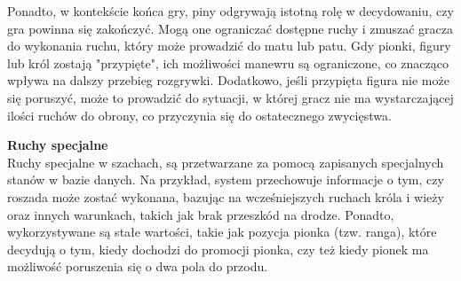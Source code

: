 \documentclass[twoside]{projektInzynierskiMS1}
\begin{document}
\noindent
Ponadto, w kontekście końca gry, piny odgrywają istotną rolę w decydowaniu, czy gra powinna się zakończyć. Mogą one ograniczać dostępne ruchy i zmuszać gracza do wykonania ruchu, który może prowadzić do matu lub patu. Gdy pionki, figury lub król zostają "przypięte", ich możliwości manewru są ograniczone, co znacząco wpływa na dalszy przebieg rozgrywki. Dodatkowo, jeśli przypięta figura nie może się poruszyć, może to prowadzić do sytuacji, w której gracz nie ma wystarczającej ilości ruchów do obrony, co przyczynia się do ostatecznego zwycięstwa.

\newpage

\noindent \textbf{Ruchy specjalne}\\
Ruchy specjalne w szachach, są przetwarzane za pomocą zapisanych specjalnych stanów w bazie danych. Na przykład, system przechowuje informacje o tym, czy roszada może zostać wykonana, bazując na wcześniejszych ruchach króla i wieży oraz innych warunkach, takich jak brak przeszkód na drodze. Ponadto, wykorzystywane są stałe wartości, takie jak pozycja pionka (tzw. ranga), które decydują o tym, kiedy dochodzi do promocji pionka, czy też kiedy pionek ma możliwość poruszenia się o dwa pola do przodu.
\end{document}
